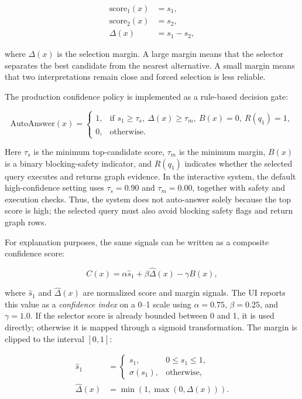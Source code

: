\begin{align}
\text{score}_1(x) &= s_1, \\
\text{score}_2(x) &= s_2, \\
\Delta(x) &= s_1 - s_2,
\end{align}

where $\Delta(x)$ is the selection margin. A large margin means that the
selector separates the best candidate from the nearest alternative. A small
margin means that two interpretations remain close and forced selection is less
reliable.

The production confidence policy is implemented as a rule-based decision gate:

\begin{equation}
\text{AutoAnswer}(x) =
\begin{cases}
1, & \text{if } s_1 \geq \tau_s,\ \Delta(x) \geq \tau_m,\ B(x)=0,\ R(q_1)=1, \\
0, & \text{otherwise.}
\end{cases}
\end{equation}

Here $\tau_s$ is the minimum top-candidate score, $\tau_m$ is the minimum
margin, $B(x)$ is a binary blocking-safety indicator, and $R(q_1)$ indicates
whether the selected query executes and returns graph evidence. In the
interactive system, the default high-confidence setting uses $\tau_s=0.90$ and
$\tau_m=0.00$, together with safety and execution checks. Thus, the system does
not auto-answer solely because the top score is high; the selected query must
also avoid blocking safety flags and return graph rows.

For explanation purposes, the same signals can be written as a composite
confidence score:

\begin{equation}
C(x) = \alpha \hat{s}_1 + \beta \hat{\Delta}(x) - \gamma B(x),
\end{equation}

where $\hat{s}_1$ and $\hat{\Delta}(x)$ are normalized score and margin signals.
The UI reports this value as a \emph{confidence index} on a 0--1 scale using
$\alpha=0.75$, $\beta=0.25$, and $\gamma=1.0$. If the selector score is already
bounded between 0 and 1, it is used directly; otherwise it is mapped through a
sigmoid transformation. The margin is clipped to the interval $[0,1]$:

\begin{align}
\hat{s}_1 &=
\begin{cases}
s_1, & 0 \leq s_1 \leq 1, \\
\sigma(s_1), & \text{otherwise,}
\end{cases} \\
\hat{\Delta}(x) &= \min(1,\max(0,\Delta(x))).
\end{align}

